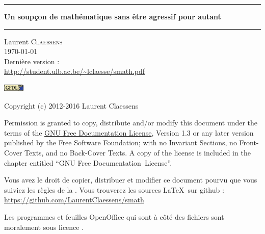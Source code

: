 
\thispagestyle{empty}

\begin{center}
  \begin{minipage}{15cm}
    \hrule\par
    \vspace{2mm}
    \begin{center}
    \Huge \bfseries Un soupçon de mathématique sans être agressif pour autant \par
    \end{center}
    \hrule\par
  \end{minipage}
\end{center}

\vspace{2cm}

\begin{center}
    Laurent \textsc{Claessens}\\
    \today\\
    Dernière version :\\
    \url{http://student.ulb.ac.be/~lclaesse/smath.pdf}
\end{center}

\vfill

\begin{center}
            \includegraphics[width=1cm]{gfdl-logo-small.pdf}
\end{center}

Copyright (c) 2012-2016  Laurent Claessens

Permission is granted to copy, distribute and/or modify this document under the terms of the \href{http://www.gnu.org/licenses/fdl-1.3.html}{GNU Free Documentation License}, Version 1.3 or any later version published by the Free Software Foundation; with no Invariant Sections, no Front-Cover Texts, and no Back-Cover Texts. A copy of the license is included in the chapter entitled ``GNU Free Documentation~License''.

\vspace{0.5cm}

Vous avez le droit de copier, distribuer et modifier ce document pourvu que vous suiviez les règles de la . Vous trouverez les sources \LaTeX\ sur github :\\
    \url{https://github.com/LaurentClaessens/smath}

    Les programmes et feuilles OpenOffice qui sont à côté des fichiers  sont moralement sous licence .
